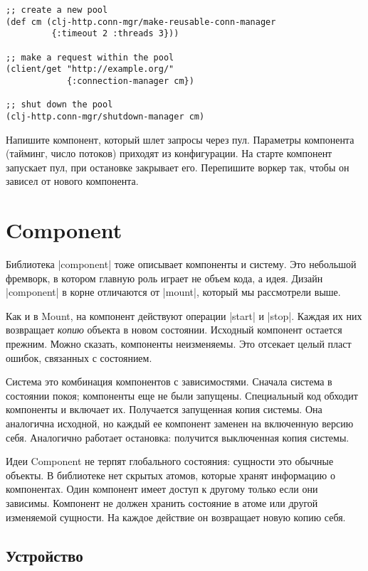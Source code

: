 \begin{verbatim}
;; create a new pool
(def cm (clj-http.conn-mgr/make-reusable-conn-manager
         {:timeout 2 :threads 3}))

;; make a request within the pool
(client/get "http://example.org/"
            {:connection-manager cm})

;; shut down the pool
(clj-http.conn-mgr/shutdown-manager cm)
\end{verbatim}

Напишите компонент, который шлет запросы через пул. Параметры компонента
(тайминг, число потоков) приходят из конфигурации. На старте компонент запускает
пул, при остановке закрывает его. Перепишите воркер так, чтобы он зависел от
нового компонента.

\section{Component}

Библиотека \spverb|component|
тоже описывает компоненты и систему. Это небольшой фремворк, в котором главную
роль играет не объем кода, а идея. Дизайн \spverb|component| в корне отличаются
от \spverb|mount|, который мы рассмотрели выше.

Как и в Mount, на компонент действуют операции \spverb|start| и
\spverb|stop|. Каждая их них возвращает \emph{копию} объекта в новом
состоянии. Исходный компонент остается прежним. Можно сказать, компоненты
неизменяемы. Это отсекает целый пласт ошибок, связанных с состоянием.

Система это комбинация компонентов с зависимостями. Сначала система в состоянии
покоя; компоненты еще не были запущены. Специальный код обходит компоненты и
включает их. Получается запущенная копия системы. Она аналогична исходной, но
каждый ее компонент заменен на включенную версию себя. Аналогично работает
остановка: получится выключенная копия системы.

Идеи Component не терпят глобального состояния: сущности это обычные объекты. В
библиотеке нет скрытых атомов, которые хранят информацию о компонентах. Один
компонент имеет доступ к другому только если они зависимы. Компонент не должен
хранить состояние в атоме или другой изменяемой сущности. На каждое действие он
возвращает новую копию себя.

\subsection{Устройство}

